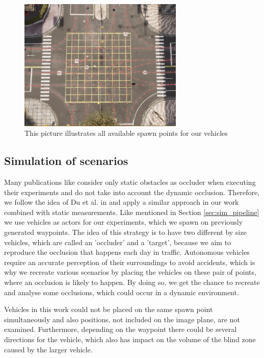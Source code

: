 \begin{figure} [h!]
    \centering
    \includegraphics[width=0.7\textwidth]{images/waypoints.png}
    \caption[Intersection waypoints]{This picture illustrates all available spawn points for our vehicles}
    \label{fig:waypoints}
\end{figure}
\newpage

\subsection{Simulation of scenarios} \label{sec:sim_stage}
Many publications like \cite{total_coverage_optimum, max_camera_coverage} consider only static obstacles as occluder when executing their experiments and do not take into account the dynamic occlusion. Therefore, we follow the idea of Du et al. in \cite{occlusion_degree_model} and apply a similar approach in our work combined with static measurements. Like mentioned in Section \ref{sec:sim_pipeline} we use vehicles as actors for our experiments, which we spawn on previously generated waypoints. The idea of this strategy is to have two different by size vehicles, which are called an 'occluder' and a 'target', because we aim to reproduce the occlusion that happens each day in traffic. Autonomous vehicles require an accurate perception of their surroundings to avoid accidents, which is why we recreate various scenarios by placing the vehicles on these pair of points, where an occlusion is likely to happen. By doing so, we get the chance to recreate and analyse some occlusions, which could occur in a dynamic environment.

Vehicles in this work could not be placed on the same spawn point simultaneously and also positions, not included on the image plane, are not examined. Furthermore, depending on the waypoint there could be several directions for the vehicle, which also has impact on the volume of the blind zone caused by the larger vehicle. 

